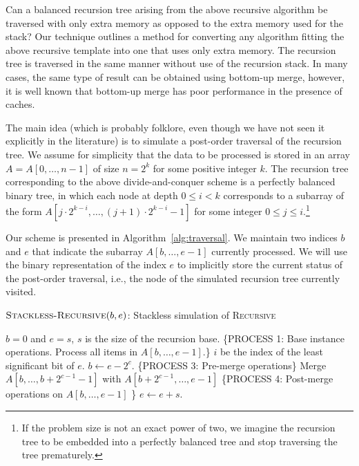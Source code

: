 Can a balanced recursion tree arising from the above recursive
algorithm be traversed with only  extra memory as opposed to the
 extra memory used for the stack?  Our technique outlines a
method for converting any algorithm fitting the above recursive
template into one that uses only  extra memory. The recursion
tree is traversed in the same manner without use of the recursion
stack. In many cases, the same type of result can be obtained using
bottom-up merge, however, it is well known that bottom-up merge has
poor performance in the presence of caches.

The main idea (which is probably folklore, even though we have not
seen it explicitly in the literature) is to simulate a post-order
traversal of the recursion tree. We assume for simplicity that the
data to be processed is stored in an array $A=A[0,\ldots,n-1]$ of size
$n = 2^k$ for some positive integer $k$. The recursion tree
corresponding to the above divide-and-conquer scheme is a perfectly
balanced binary tree, in which each node at depth $0 \leq i < k$
corresponds to a subarray of the form $A[j \cdot 2^{k-i} ,\ldots, (j +
1) \cdot 2^{k-i} - 1]$ for some integer $0 \leq j \leq i$.\footnote{If
the problem size is not an exact power of two, we imagine the
recursion tree to be embedded into a perfectly balanced tree and stop
traversing the tree prematurely.}

Our scheme is presented in Algorithm~\ref{alg:traversal}. We maintain
two indices $b$ and $e$ that indicate the subarray $A[b ,\ldots, e-1]$
currently processed. We will use the binary representation of the
index $e$ to implicitly store the current status of the post-order
traversal, i.e., the node of the simulated recursion tree currently
visited.

\begin{algorithm}
  \caption{$\textsc{Stackless-Recursive}(b,e)$: Stackless simulation
of \textsc{Recursive}}
  \label{alg:traversal}
  \begin{algorithmic}[1]
    \STATE $b=0$ and $e=s$, $s$ is the size of the recursion base.
    \STATE \{PROCESS 1: Base instance operations. Process all items in
$A[b,\ldots, e-1]$.\}
    \STATE $i$ be the index of the least significant bit of $e$.
    \STATE $b \gets e-2^c$.
    \STATE \{PROCESS 3: Pre-merge operations\}
    \STATE Merge  $A[b,\ldots, b+2^{c-1} - 1]$ with
$A[b+2^{c-1},\ldots, e-1]$
    \STATE \{PROCESS 4: Post-merge operations on $A[b,\ldots, e-1]$ \}
    \ENDFOR 
    \STATE $e \gets e + s$.
    \ENDWHILE
  \end{algorithmic}
\end{algorithm}

